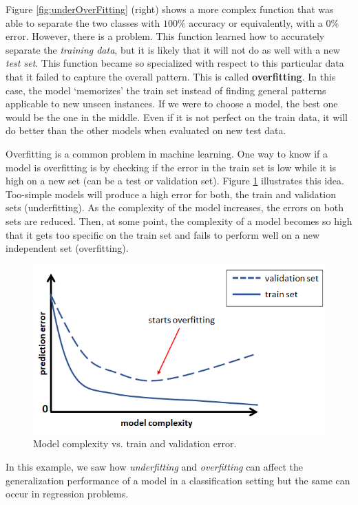 \documentclass[
  11pt,
]{krantz}
\begin{document}
Figure \ref{fig:underOverFitting} (right) shows a more complex function that was able to separate the two classes with \(100\%\) accuracy or equivalently, with a \(0\%\) error. However, there is a problem. This function learned how to accurately separate the \emph{training data}, but it is likely that it will not do as well with a new \emph{test set}. This function became so specialized with respect to this particular data that it failed to capture the overall pattern. This is called \textbf{overfitting}. In this case, the model `memorizes' the train set instead of finding general patterns applicable to new unseen instances. If we were to choose a model, the best one would be the one in the middle. Even if it is not perfect on the train data, it will do better than the other models when evaluated on new test data.

Overfitting is a common problem in machine learning. One way to know if a model is overfitting is by checking if the error in the train set is low while it is high on a new set (can be a test or validation set). Figure \ref{fig:modelComplexity} illustrates this idea. Too-simple models will produce a high error for both, the train and validation sets (underfitting). As the complexity of the model increases, the errors on both sets are reduced. Then, at some point, the complexity of a model becomes so high that it gets too specific on the train set and fails to perform well on a new independent set (overfitting).

\begin{figure}

{\centering \includegraphics[width=0.6\linewidth]{images/model_complexity} 

}

\caption{Model complexity vs. train and validation error.}\label{fig:modelComplexity}
\end{figure}

In this example, we saw how \emph{underfitting} and \emph{overfitting} can affect the generalization performance of a model in a classification setting but the same can occur in regression problems.
\end{document}
